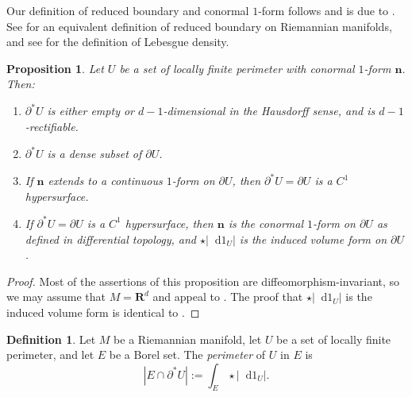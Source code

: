 \documentclass[reqno,10pt]{amsart}
\newcommand{\RR}{\mathbf{R}}
\newcommand*\dif{\mathop{}\!\mathrm{d}}
\newcommand{\normal}{\mathbf n}
\newcommand{\dfn}[1]{\emph{#1}\index{#1}}
\newtheorem{proposition}[theorem]{Proposition}
\theoremstyle{definition}
\newtheorem{definition}[theorem]{Definition}
\numberwithin{equation}{section}
\begin{document}
Our definition of reduced boundary and conormal $1$-form follows \cite[Definition 3.3]{Giusti77} and is due to \cite{deGiorgi55}.
See \cite{Battista_2021} for an equivalent definition of reduced boundary on Riemannian manifolds, and see \cite[Chapter 6]{Pugh02} for the definition of Lebesgue density.

\begin{proposition}\label{locality of Caccioppoli}
    Let $U$ be a set of locally finite perimeter with conormal $1$-form $\normal$.
    Then:
    \begin{enumerate}
    \item $\partial^* U$ is either empty or $d-1$-dimensional in the Hausdorff sense, and is $d-1$-rectifiable.
    \item $\partial^* U$ is a dense subset of $\partial U$.
    \item If $\normal$ extends to a continuous $1$-form on $\partial U$, then $\partial^* U = \partial U$ is a $C^1$ hypersurface.
    \item If $\partial^* U = \partial U$ is a $C^1$ hypersurface, then $\normal$ is the conormal $1$-form on $\partial U$ as defined in differential topology, and $\star |\dif 1_U|$ is the induced volume form on $\partial U$.
\end{enumerate}
\end{proposition}
\begin{proof}
Most of the assertions of this proposition are diffeomorphism-invariant, so we may assume that $M = \RR^d$ and appeal to \cite[Chapters 2-4]{Giusti77}.
The proof that $\star |\dif 1_U|$ is the induced volume form is identical to \cite[Example 1.4]{Giusti77}.
\end{proof}

\begin{definition}
Let $M$ be a Riemannian manifold, let $U$ be a set of locally finite perimeter, and let $E$ be a Borel set.
The \dfn{perimeter} of $U$ in $E$ is
$$|E \cap \partial^* U| := \int_E \star |\dif 1_U|.$$
\end{definition}
\end{document}
